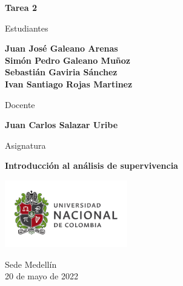 \begin{titlepage}
   \Large{
   \begin{center}
       \vspace*{1cm}

       \textbf{Tarea 2}

            
       \vspace{1.1cm}
       
       Estudiantes
       
       \vspace{0.5cm}
        
	\textbf{Juan José Galeano Arenas} \\

       \textbf{Simón Pedro Galeano Muñoz} \\

	\textbf{Sebastián Gaviria Sánchez} \\

	\textbf{Ivan Santiago Rojas Martinez}

              \vspace{1cm}
       
       Docente
       
       \vspace{0.5cm}

       \textbf{Juan Carlos Salazar Uribe}
       
       \vspace{0.4cm}

       \vspace{1.4cm}
       
       Asignatura
       
       \vspace{0.5cm}

       \textbf{Introducción al análisis de supervivencia}

       \vfill

            
       \vspace{0.4cm}
     
       \includegraphics[width=0.4\textwidth]{logounal.png}
            
       Sede Medellín\\
       20 de mayo de 2022
       
   \end{center}
   }
\end{titlepage}